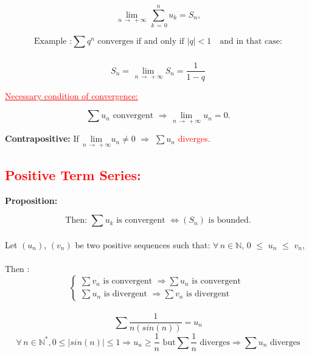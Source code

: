 \documentclass[a4paper,12pt]{article}
\begin{document}
  \[
  \lim_{\,n \,\to\, +\infty} \sum_{\,k\,=\,0}^n u_k = S_n,
  \]

\[ \text{Example :} \sum_ {} {q^n} \text{ converges if and only if } |q| < 1 \quad \text{and in that case:}
\]

\[
S_n = \lim_{\,n\, \to\, +\infty} S_n = \frac{1}{1-q}
\]


\textcolor{red}{\underline{Necessary condition of convergence:}}

\[
\sum u_n \text{ convergent } \Rightarrow \lim_{\,n \,\to\, +\infty} u_n = 0.
\]

\begin{tcolorbox}[colback=red!5!white,colframe=red!75!black]
\textbf{Contrapositive:}  
If $\underset{\,n \,\to\, +\infty}{\text{lim}} u_n \neq  0$ $\Rightarrow$ $\sum u_n$ \textcolor{red}{diverges}.
\end{tcolorbox}

\textcolor{red}{\subsection*{Positive Term Series:}}\bigskip

\bigskip

\textbf{Proposition:}  

\[
\text{Then: } \sum u_k \text{ is convergent } \Leftrightarrow (S_n) \text{ is bounded}.
\]
\\
Let $(u_n)$, $(v_n)$ be two positive sequences such that: $\forall \,{n} \in \mathbb{N}$, 0 $\leq$ $u_n$ $\leq$ $v_n$,\\
\\ Then :
\[
\begin{cases}

\sum v_n \text{ is convergent } \Rightarrow \sum u_n \text{ is convergent } \\[6pt]

\sum u_n \text{ is divergent } \Rightarrow \sum v_n \text{ is divergent }

\end{cases}
\]
 \\
\[
\sum \frac{1}{n(sin(n))} = u_n
\]
\bigskip
\[
\forall \, n \in \mathbb{N^*}, 0 \leq |sin(n)| \leq 1 \Rightarrow u_n \ge \frac{1}{n} \text{ but} \sum \frac{1}{n} \text{ diverges} \Rightarrow \sum u_n \text{ diverges}
\]
\bigskip
\end{document}
